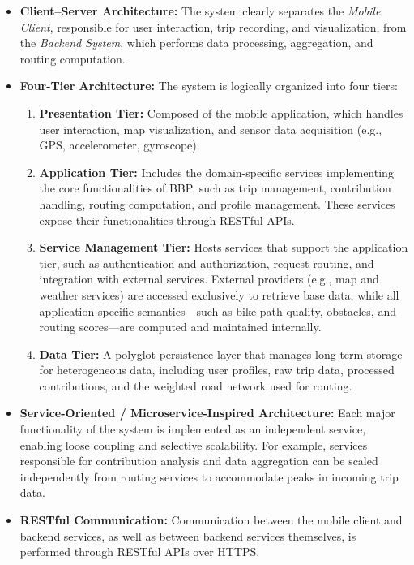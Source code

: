 \begin{itemize}
    \item \textbf{Client--Server Architecture:} The system clearly separates the \textit{Mobile Client}, responsible for user interaction, trip recording, and visualization, from the \textit{Backend System}, which performs data processing, aggregation, and routing computation.

    \item \textbf{Four-Tier Architecture:} The system is logically organized into four tiers:
    \begin{enumerate}
        \item \textbf{Presentation Tier:} Composed of the mobile application, which handles user interaction, map visualization, and sensor data acquisition (e.g., GPS, accelerometer, gyroscope).

        \item \textbf{Application Tier:} Includes the domain-specific services implementing the core functionalities of BBP, such as trip management, contribution handling, routing computation, and profile management. These services expose their functionalities through RESTful APIs.

        \item \textbf{Service Management Tier:} Hosts services that support the application tier, such as authentication and authorization, request routing, and integration with external services. External providers (e.g., map and weather services) are accessed exclusively to retrieve base data, while all application-specific semantics—such as bike path quality, obstacles, and routing scores—are computed and maintained internally.

        \item \textbf{Data Tier:} A polyglot persistence layer that manages long-term storage for heterogeneous data, including user profiles, raw trip data, processed contributions, and the weighted road network used for routing.
    \end{enumerate}

    \item \textbf{Service-Oriented / Microservice-Inspired Architecture:} Each major functionality of the system is implemented as an independent service, enabling loose coupling and selective scalability. For example, services responsible for contribution analysis and data aggregation can be scaled independently from routing services to accommodate peaks in incoming trip data.

    \item \textbf{RESTful Communication:} Communication between the mobile client and backend services, as well as between backend services themselves, is performed through RESTful APIs over HTTPS.
\end{itemize}


